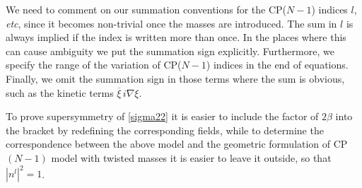 \documentclass[12pt]{article}
\newcommand{\ov}{\overline}
\begin{document}
	We need to comment on our summation conventions for the CP($N-1$) indices $l$, {\it etc}, since
	it becomes non-trivial once the masses are introduced.
	The sum in $l$ is always implied if the index is written more than once.
	In the places where this can cause ambiguity we put the summation sign explicitly.
	Furthermore, we specify the range of the variation of CP($N-1$) indices
	in the end of equations.
	Finally, we omit the summation sign in those terms where the sum is obvious,
	such as the kinetic terms $ \ov{\xi}\, i\nabla \xi $.
	
	To prove supersymmetry of \eqref{sigma22} it is easier to include the factor of $ 2\beta $ into 
	the bracket by redefining the corresponding fields, while to determine the correspondence between the 
	above model and the geometric formulation of CP$(N-1)$ model with twisted masses it is easier to leave
	it outside, so that $ |n^l|^2 = 1 $.
	
\end{document}
